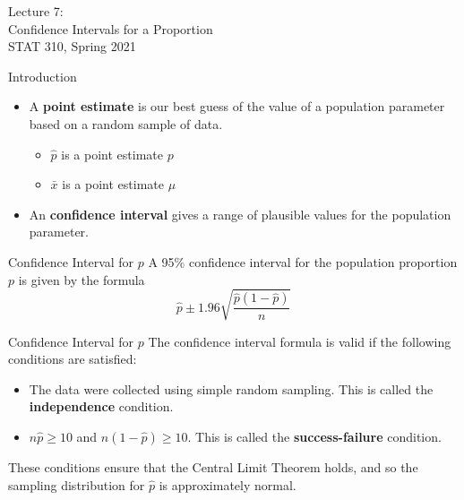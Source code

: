 \documentclass[11pt]{beamer}
\begin{document}
\begin{frame}
\large
Lecture 7:\\
Confidence Intervals for a Proportion\\
STAT 310, Spring 2021
\normalsize
\end{frame}

\begin{frame}{Introduction}
\begin{itemize}
\item A \textbf{point estimate} is our best guess of the value of a population parameter based on a random sample of data.
\vspace{5pt}
\begin{itemize}
\item $\hat{p}$ is a point estimate $p$
\vspace{5pt}
\item $\bar{x}$ is a point estimate $\mu$
\end{itemize}
\vspace{10pt}
\item An \textbf{confidence interval} gives a range of plausible values for the population parameter.
\end{itemize}
\end{frame}

\begin{frame}{Confidence Interval for $p$}
\vspace{-1.5cm}
A 95\% confidence interval for the population proportion $p$ is given by the formula\\
\vspace{5pt}
$$\hat{p} \pm 1.96 \sqrt{\frac{\hat{p}(1-\hat{p})}{n}}$$
\end{frame}

\begin{frame}{Confidence Interval for $p$}
The confidence interval formula is valid if the following conditions are satisfied:
\begin{itemize}
\vspace{5pt}
\item The data were collected using simple random sampling.  This is called the \textbf{independence} condition.
\vspace{5pt}
\item $n \hat{p} \geq 10$ and $n (1-\hat{p}) \geq 10$.  This is called the \textbf{success-failure} condition.
\end{itemize}
\vspace{5pt}
These conditions ensure that the Central Limit Theorem holds, and so the sampling distribution for $\hat{p}$ is approximately normal.
\end{frame}
\end{document}
